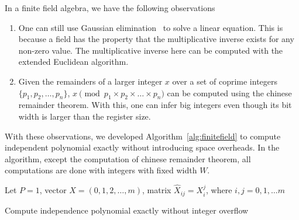 \documentclass{article}
\newcommand{\<}{\langle}
\renewcommand{\>}{\rangle}
\renewcommand{\cite}[1]{{\citep{#1}}}
\theoremstyle{definition}\newtheorem{definition}{\textit{Definition}}
\begin{document}
In a finite field algebra, we have the following observations
\begin{enumerate}
    \item One can still use Gaussian elimination~\cite{Golub2013} to solve a linear equation.
    This is because a field has the property that the multiplicative inverse exists for any non-zero value.
    The multiplicative inverse here can be computed with the extended Euclidean algorithm.
    \item Given the remainders of a larger integer $x$ over a set of coprime integers $\{p_1, p_2, \ldots, p_n\}$,
    $x \pmod {p_1 \times p_2 \times \ldots \times p_n}$ can be computed using the chinese remainder theorem.
    With this, one can infer big integers even though its bit width is larger than the register size.
\end{enumerate}
With these observations, we developed Algorithm~\ref{alg:finitefield} to compute independent polynomial exactly without introducing space overheads.
In the algorithm, except the computation of chinese remainder theorem, all computations are done with integers with fixed width $W$.

\begin{algorithm}[!ht]
    \small
    \SetAlgoNoLine
    \LinesNumbered
    Let $P = 1$, vector $X = (0,1,2,\ldots,m)$, matrix $\hat X_{ij} = X_i^j$, where $i,j = 0, 1, \ldots m$\;
    \caption{Compute independence polynomial exactly without integer overflow}\label{alg:finitefield}
\end{algorithm}
\end{document}
